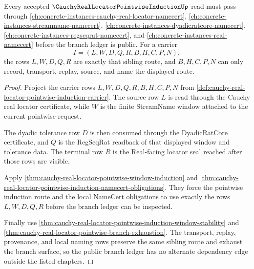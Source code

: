 \begin{theorem}
\label{thm:cauchy-real-locator-pointwise-induction-sibling-route}
Every accepted $\CauchyRealLocatorPointwiseInductionUp$ read must pass through \autoref{ch:concrete-instances-cauchy-real-locator-namecert}, \autoref{ch:concrete-instances-streamname-namecert}, \autoref{ch:concrete-instances-dyadicratcore-namecert}, \autoref{ch:concrete-instances-regseqrat-namecert}, and \autoref{ch:concrete-instances-real-namecert} before the branch ledger is public. For a carrier
$$
I=(L,W,D,Q,R,B,H,C,P,N),
$$
the rows $L,W,D,Q,R$ are exactly that sibling route, and $B,H,C,P,N$ can only record, transport, replay, source, and name the displayed route.
\end{theorem}
\begin{proof}
Project the carrier rows $L,W,D,Q,R,B,H,C,P,N$ from \autoref{def:cauchy-real-locator-pointwise-induction-carrier}. The source row $L$ is read through the Cauchy real locator certificate, while $W$ is the finite StreamName window attached to the current pointwise request.

The dyadic tolerance row $D$ is then consumed through the DyadicRatCore certificate, and $Q$ is the RegSeqRat readback of that displayed window and tolerance data. The terminal row $R$ is the Real-facing locator seal reached after those rows are visible.

Apply \autoref{thm:cauchy-real-locator-pointwise-window-induction} and \autoref{thm:cauchy-real-locator-pointwise-induction-namecert-obligations}. They force the pointwise induction route and the local NameCert obligations to use exactly the rows $L,W,D,Q,R$ before the branch ledger can be inspected.

Finally use \autoref{thm:cauchy-real-locator-pointwise-induction-window-stability} and \autoref{thm:cauchy-real-locator-pointwise-branch-exhaustion}. The transport, replay, provenance, and local naming rows preserve the same sibling route and exhaust the branch surface, so the public branch ledger has no alternate dependency edge outside the listed chapters.
\end{proof}


